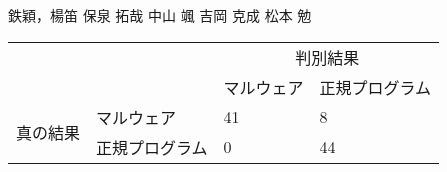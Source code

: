 
鉄穎，楊笛
保泉 拓哉
中山 颯
吉岡 克成
松本 勉








\begin{table}[]
    \begin{tabular}{ll|l|l|}
    \cline{3-4}
                                                &         & \multicolumn{2}{c|}{判別結果} \\ \cline{3-4} 
                                                &         & マルウェア      & 正規プログラム      \\ \hline
    \multicolumn{1}{|c|}{\multirow{2}{*}{真の結果}} & マルウェア   & 41         & 8            \\ \cline{2-4} 
    \multicolumn{1}{|c|}{}                      & 正規プログラム & 0          & 44           \\ \hline
    \end{tabular}
    \end{table}
